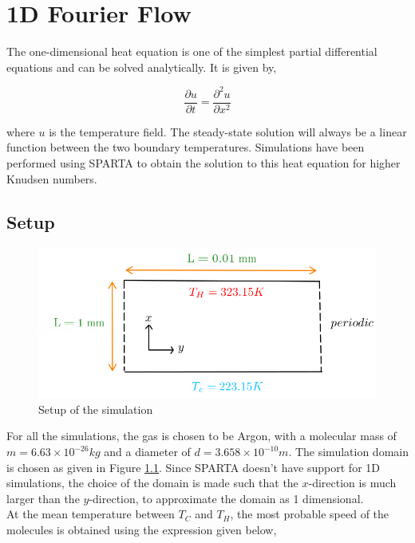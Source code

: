 \newpage
\chapter{1D Fourier Flow}

The one-dimensional heat equation is one of the simplest partial differential equations and can be solved analytically. It is given by,

\begin{equation}
	\frac{\partial u}{\partial t} = \frac{\partial^2 u}{\partial x^2}
\end{equation}

\no where $u$ is the temperature field. The steady-state solution will always be a linear function between the two boundary temperatures. Simulations have been performed using SPARTA to obtain the solution to this heat equation for higher Knudsen numbers.

\section{Setup}

\begin{figure}[H]
  \includegraphics[scale=0.5]{Pictures/Chapter_5_1D_Fourier_Flow/Setup.png}
  \centering
  \caption{Setup of the simulation}
  \label{img:domain}
\end{figure}

For all the simulations, the gas is chosen to be Argon, with a molecular mass of $m = 6.63 \times 10^{-26} kg$ and a diameter of $d = 3.658 \times 10^{-10} m$. The simulation domain is chosen as given in Figure \ref{img:domain}. Since SPARTA doesn't have support for 1D simulations, the choice of the domain is made such that the $x$-direction is much larger than the $y$-direction, to approximate the domain as 1 dimensional. \\

\no At the mean temperature between $T_C$ and $T_H$, the most probable speed of the molecules is obtained using the expression given below,

